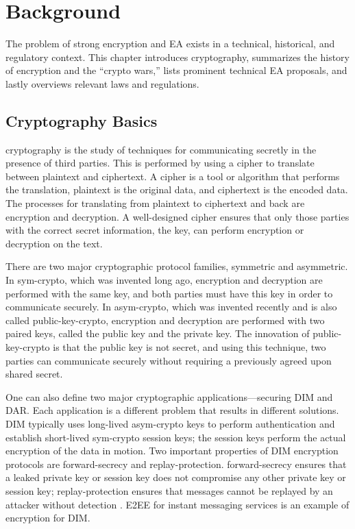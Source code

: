 \chapter{Background}
\label{chap-background}

The problem of strong encryption and \acl{EA} exists in a technical, historical, and regulatory context. This chapter
introduces cryptography, summarizes the history of encryption and the ``crypto wars,'' lists prominent technical \ac{EA}
proposals, and lastly overviews relevant laws and regulations.



\section{Cryptography Basics}
\label{sec-crypto-basics}

\Ac{cryptography} is the study of techniques for communicating secretly in the presence of third parties. This is
performed by using a \ac{cipher} to translate between \ac{plaintext} and \ac{ciphertext}. A cipher is a tool or
algorithm that performs the translation, plaintext is the original data, and ciphertext is the encoded data. The
processes for translating from plaintext to ciphertext and back are \ac{encryption} and \ac{decryption}. A well-designed
cipher ensures that only those parties with the correct secret information, the \ac{key}, can perform encryption or
decryption on the text.


There are two major cryptographic protocol families, symmetric and asymmetric. In \ac{sym-crypto}, which was invented
long ago, encryption and decryption are performed with the same key, and both parties must have this key in order to
communicate securely. In \ac{asym-crypto}, which was invented recently and is also called \ac{public-key-crypto},
encryption and decryption are performed with two paired keys, called the public key and the private key. The innovation
of \ac{public-key-crypto} is that the public key is not secret, and using this technique, two parties can communicate
securely without requiring a previously agreed upon shared secret.

One can also define two major cryptographic applications---securing \acf{DIM} and \acf{DAR}. Each application is a
different problem that results in different solutions. \Ac{DIM} typically uses long-lived \ac{asym-crypto} keys to
perform authentication and establish short-lived \ac{sym-crypto} session keys; the session keys perform the actual
encryption of the data in motion. Two important properties of \ac{DIM} encryption protocols are \ac{forward-secrecy} and
\ac{replay-protection}. \Ac{forward-secrecy} ensures that a leaked private key or session key does not compromise any
other private key or session key; \ac{replay-protection} ensures that messages cannot be replayed by an attacker without
detection \cite{bellovin_thinking_2016}. \Ac{E2EE} for instant messaging services is an example of encryption for
\ac{DIM}.

